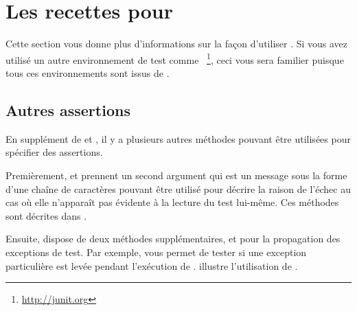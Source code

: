 \documentclass[a4paper,10pt,twoside]{book}
\begin{document}
\section{Les recettes pour \SUnit}
Cette section vous donne plus d'informations sur la façon d'utiliser \SUnit. Si vous avez utilisé un autre environnement de test comme \JUnit~\footnote{\url{http://junit.org}}, ceci vous sera familier puisque tous ces environnements sont issus de  \SUnit. 

\subsection{Autres assertions}
En supplément de  et , il y a plusieurs autres méthodes pouvant être utilisées pour spécifier des assertions. 


Premièrement,  et  prennent un second argument qui est un message sous la forme d'une chaîne de caractères pouvant être utilisé pour décrire la raison de l'échec au cas où elle n'apparaît pas évidente à la lecture du test lui-même. Ces méthodes sont décrites dans .


Ensuite, \sunit dispose de deux méthodes supplémentaires,  et   pour la propagation des exceptions de test. Par exemple,  vous permet de tester si une exception particulière est levée pendant l'exécution de .  illustre l'utilisation de \mbox{}.
\end{document}
